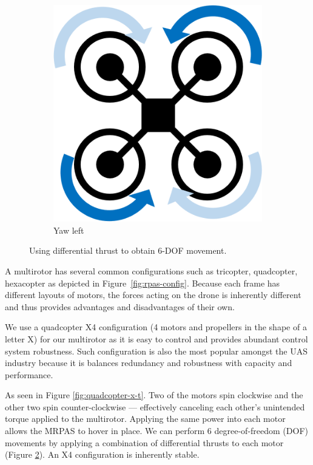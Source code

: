 \begin{figure}[h]
	~
	\begin{subfigure}[b]{0.3\textwidth}
		\centering
		\includegraphics[scale=0.4]{img/drone_x_yaw}
		\caption{Yaw left}
		\label{fig:x-yaw}
	\end{subfigure}
	
	\caption{Using differential thrust to obtain 6-DOF movement. }
	\label{fig:rpas_6dof}
\end{figure}

A multirotor has several common configurations such as tricopter, quadcopter, hexacopter as depicted in Figure~\ref{fig:rpas-config}. Because each frame has different layouts of motors, the forces acting on the drone is inherently different and thus provides advantages and disadvantages of their own.

We use a quadcopter X4 configuration (4 motors and propellers in the shape of a letter X) for our multirotor as it is easy to control and provides abundant control system robustness. Such configuration is also the most popular amongst the UAS industry because it is balances redundancy and robustness with capacity and performance.

As seen in Figure \ref{fig:quadcopter-x-t}. Two of the motors spin clockwise and the other two spin counter-clockwise --- effectively canceling each other's unintended torque applied to the multirotor. Applying the same power into each motor allows the MRPAS to hover in place. We can perform 6 degree-of-freedom (DOF) movements by applying a combination of differential thrusts to each motor (Figure \ref{fig:rpas_6dof}). An X4 configuration is inherently stable.

